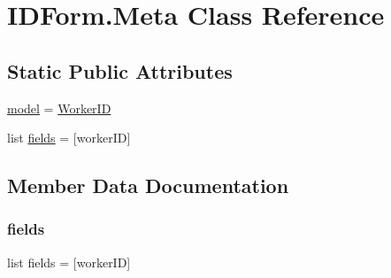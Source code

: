 \hypertarget{classdynamicfilterapp_1_1forms_1_1_i_d_form_1_1_meta}{}\section{I\+D\+Form.\+Meta Class Reference}
\label{classdynamicfilterapp_1_1forms_1_1_i_d_form_1_1_meta}
\subsection*{Static Public Attributes}
\begin{DoxyCompactItemize}
\item 
\mbox{\hyperlink{classdynamicfilterapp_1_1forms_1_1_i_d_form_1_1_meta_a508cc3106d2c29fe07dc87cbe3ea6927}{model}} = \mbox{\hyperlink{classdynamicfilterapp_1_1models_1_1_worker_i_d}{Worker\+ID}}
\item 
list \mbox{\hyperlink{classdynamicfilterapp_1_1forms_1_1_i_d_form_1_1_meta_a95a6920fe0e5c16303574629629ce2c1}{fields}} = \mbox{[}\textquotesingle{}worker\+ID\textquotesingle{}\mbox{]}
\end{DoxyCompactItemize}


\subsection{Member Data Documentation}
\mbox{\label{classdynamicfilterapp_1_1forms_1_1_i_d_form_1_1_meta_a95a6920fe0e5c16303574629629ce2c1}} 
\subsubsection{\texorpdfstring{fields}{fields}}
{\footnotesize\ttfamily list fields = \mbox{[}\textquotesingle{}worker\+ID\textquotesingle{}\mbox{]}\hspace{0.3cm}{\ttfamily [static]}}

\mbox{\label{classdynamicfilterapp_1_1forms_1_1_i_d_form_1_1_meta_a508cc3106d2c29fe07dc87cbe3ea6927}} 
